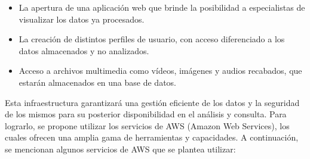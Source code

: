\begin{itemize}
    \item La apertura de una aplicación web que brinde la posibilidad a especialistas de visualizar los datos ya procesados.
    \item  La creación de distintos perfiles de usuario, con acceso diferenciado a los datos almacenados y no analizados.
    \item Acceso a archivos multimedia como vídeos, imágenes y audios recabados, que estarán almacenados en una base de datos.
\end{itemize}

\noindent Esta infraestructura garantizará una gestión eficiente de los datos y la seguridad de los mismos para su posterior disponibilidad en el análisis y consulta.
Para lograrlo, se propone utilizar los servicios de AWS (Amazon Web Services), los cuales ofrecen una amplia gama de herramientas y capacidades. A continuación, se mencionan algunos servicios de AWS que se plantea utilizar:

